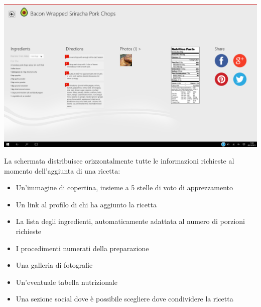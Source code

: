 \begin{center}
\includegraphics[scale=0.275] {img/Allthecooks/ricetta_2.png}  
\end{center}

La schermata distribuisce orizzontalmente tutte le informazioni richieste al momento dell'aggiunta di una ricetta:
\begin{itemize}
\item Un'immagine di copertina, insieme a 5 stelle di voto di apprezzamento
\item Un link al profilo di chi ha aggiunto la ricetta
\item La lista degli ingredienti, automaticamente adattata al numero di porzioni richieste
\item I procedimenti numerati della preparazione
\item Una galleria di fotografie
\item Un'eventuale tabella nutrizionale
\item Una sezione social dove è possibile scegliere dove condividere la ricetta
\end{itemize}

